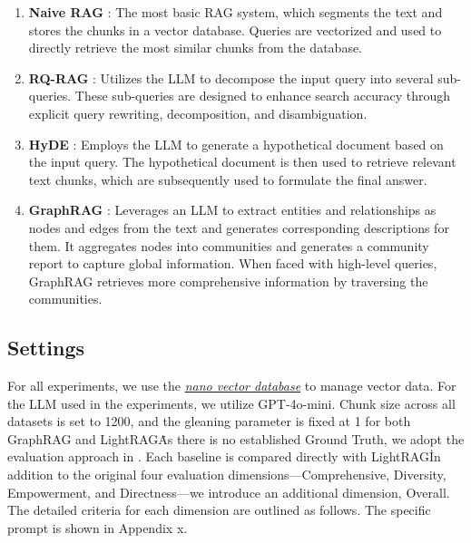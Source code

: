 \documentclass{article} %
\def\model{LightRAG}
\begin{document}
\begin{enumerate}
    \item \textbf{Naive RAG} \cite{gao2023retrieval}: The most basic RAG system, which segments the text and stores the chunks in a vector database. Queries are vectorized and used to directly retrieve the most similar chunks from the database.
    
    \item \textbf{RQ-RAG} \cite{chan2024rq}: Utilizes the LLM to decompose the input query into several sub-queries. These sub-queries are designed to enhance search accuracy through explicit query rewriting, decomposition, and disambiguation.
    
    \item \textbf{HyDE} \cite{hyde}: Employs the LLM to generate a hypothetical document based on the input query. The hypothetical document is then used to retrieve relevant text chunks, which are subsequently used to formulate the final answer.
    
    \item \textbf{GraphRAG} \cite{edge2024local}: Leverages an LLM to extract entities and relationships as nodes and edges from the text and generates corresponding descriptions for them. It aggregates nodes into communities and generates a community report to capture global information. When faced with high-level queries, GraphRAG retrieves more comprehensive information by traversing the communities.
\end{enumerate}

\subsection{Settings}

For all experiments, we use the \href{https://github.com/gusye1234/nano-vectordb}{\textit{nano vector database}} to manage vector data. For the LLM used in the experiments, we utilize GPT-4o-mini. Chunk size across all datasets is set to 1200, and the gleaning parameter is fixed at 1 for both GraphRAG and \model\. As there is no established Ground Truth, we adopt the evaluation approach in \cite{edge2024local}. Each baseline is compared directly with \model\. In addition to the original four evaluation dimensions—Comprehensive, Diversity, Empowerment, and Directness—we introduce an additional dimension, Overall. The detailed criteria for each dimension are outlined as follows. The specific prompt is shown in Appendix x.
\end{document}
